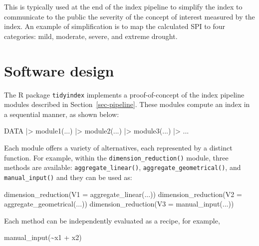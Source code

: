 \documentclass[
]{interact}
\newenvironment{Shaded}{\begin{snugshade}}{\end{snugshade}}
\newcommand{\AttributeTok}[1]{\textcolor[rgb]{0.40,0.45,0.13}{#1}}
\newcommand{\FunctionTok}[1]{\textcolor[rgb]{0.28,0.35,0.67}{#1}}
\newcommand{\NormalTok}[1]{\textcolor[rgb]{0.00,0.23,0.31}{#1}}
\newcommand{\SpecialCharTok}[1]{\textcolor[rgb]{0.37,0.37,0.37}{#1}}
\begin{document}
This is typically used at the end of the index pipeline to simplify the
index to communicate to the public the severity of the concept of
interest measured by the index. An example of simplification is to map
the calculated SPI to four categories: mild, moderate, severe, and
extreme drought.

\section{Software design}\label{sec-software}

The R package \texttt{tidyindex} implements a proof-of-concept of the
index pipeline modules described in Section~\ref{sec-pipeline}. These
modules compute an index in a sequential manner, as shown below:

\begin{Shaded}
\begin{Highlighting}[]
\NormalTok{DATA }\SpecialCharTok{|\textgreater{}} \FunctionTok{module1}\NormalTok{(...) }\SpecialCharTok{|\textgreater{}} \FunctionTok{module2}\NormalTok{(...) }\SpecialCharTok{|\textgreater{}} \FunctionTok{module3}\NormalTok{(...) }\SpecialCharTok{|\textgreater{}}\NormalTok{ ...}
\end{Highlighting}
\end{Shaded}

Each module offers a variety of alternatives, each represented by a
distinct function. For example, within the
\texttt{dimension\_reduction()} module, three methods are available:
\texttt{aggregate\_linear()}, \texttt{aggregate\_geometrical()}, and
\texttt{manual\_input()} and they can be used as:

\begin{Shaded}
\begin{Highlighting}[]
\FunctionTok{dimension\_reduction}\NormalTok{(}\AttributeTok{V1 =} \FunctionTok{aggregate\_linear}\NormalTok{(...))}
\FunctionTok{dimension\_reduction}\NormalTok{(}\AttributeTok{V2 =} \FunctionTok{aggregate\_geometrical}\NormalTok{(...))}
\FunctionTok{dimension\_reduction}\NormalTok{(}\AttributeTok{V3 =} \FunctionTok{manual\_input}\NormalTok{(...))}
\end{Highlighting}
\end{Shaded}

Each method can be independently evaluated as a recipe, for example,

\begin{Shaded}
\begin{Highlighting}[]
\FunctionTok{manual\_input}\NormalTok{(}\SpecialCharTok{\textasciitilde{}}\NormalTok{x1 }\SpecialCharTok{+}\NormalTok{ x2)}
\end{Highlighting}
\end{Shaded}
\end{document}
